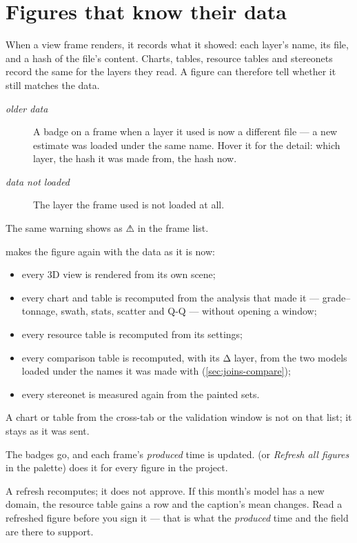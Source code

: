 \section{Figures that know their data}\label{sec:compo-refresh}

When a view frame renders, it records what it showed: each layer's name, its file, and a hash of the file's content. Charts, tables, resource tables and stereonets record the same for the layers they read. A figure can therefore tell whether it still matches the data.

\begin{description}
\item[\emph{older data}] A badge on a frame when a layer it used is now a different file — a new estimate was loaded under the same name. Hover it for the detail: which layer, the hash it was made from, the hash now.
\item[\emph{data not loaded}] The layer the frame used is not loaded at all.
\end{description}

The same warning shows as ⚠ in the frame list.

 makes the figure again with the data as it is now:

\begin{itemize}
\item every 3D view is rendered from its own scene;
\item every chart and table is recomputed from the analysis that made it — grade–tonnage, swath, stats, scatter and Q-Q — without opening a window;
\item every resource table is recomputed from its settings;
\item every comparison table is recomputed, with its Δ layer, from the two models loaded under the names it was made with (\cref{sec:joins-compare});
\item every stereonet is measured again from the painted sets.
\end{itemize}

A chart or table from the cross-tab or the validation window is not on that list; it stays as it was sent.

The badges go, and each frame's \emph{produced} time is updated.  (or \emph{Refresh all figures} in the palette) does it for every figure in the project.

\begin{caution}
A refresh recomputes; it does not approve. If this month's model has a new domain, the resource table gains a row and the caption's mean changes. Read a refreshed figure before you sign it — that is what the \emph{produced} time and the  field are there to support.
\end{caution}

